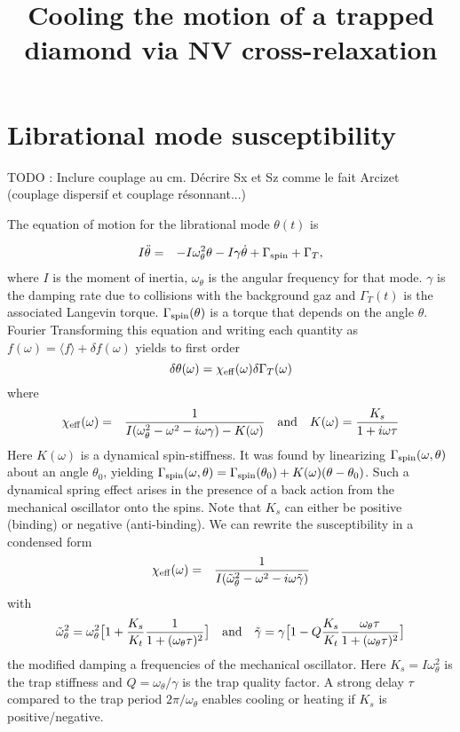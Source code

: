 \documentclass[preprintnumbers,amsmath,amssymb]{revtex4}
\newcommand{\bea}{\begin{eqnarray}}
\newcommand{\eea}{\end{eqnarray}}
\begin{document}
\title{Cooling the motion of a trapped diamond via NV cross-relaxation}

\maketitle

\tableofcontents

\section{Librational mode susceptibility}

TODO : Inclure couplage au cm. Décrire Sx et Sz comme le fait Arcizet (couplage dispersif et couplage résonnant...)

The equation of motion for the librational mode $\theta(t)$ is 

\begin{eqnarray}I \ddot \theta&=& -I \omega_\theta^2 \theta -I\gamma \dot \theta+\Gamma_{\rm spin}+\Gamma_T,
\end{eqnarray}\label{eqnmotion}
where $I$ is the moment of inertia, $\omega_\theta$ is the angular frequency for that mode. $\gamma$ is the damping rate due to collisions with the background gaz and $\Gamma_T(t)$ is the associated Langevin torque.
$\Gamma_{\rm spin}(\theta)$ is a torque that depends on the angle $\theta$. Fourier Transforming this equation and writing each quantity as $f(\omega)=\langle f \rangle+\delta f (\omega)$ yields to first order 
$$\delta \theta(\omega)=\chi_{\rm eff}(\omega)\delta\Gamma_T(\omega)$$
where
\bea
\chi_{\rm eff}(\omega)&=&\frac{1}{I(\omega_\theta^2-\omega^2-i\omega \gamma)-K(\omega)} \quad {\rm and }\quad K(\omega)=\frac{K_s}{1+i\omega\tau}\\
\eea
Here $K(\omega)$ is a dynamical spin-stiffness. 
It was found by linearizing $\Gamma_{\rm spin}(\omega,\theta)$ about an angle $\theta_0$, yielding $\Gamma_{\rm spin}(\omega,\theta)=\Gamma_{\rm spin}(\theta_0)+K(\omega) (\theta-\theta_0)$. Such a dynamical spring effect arises in the presence of a back action from the mechanical oscillator onto the spins. Note that $K_s$ can either be positive (binding) or negative (anti-binding).
We can rewrite the susceptibility in a condensed form 
\bea
\chi_{\rm eff}(\omega)&=&\frac{1}{I(\tilde\omega_\theta^2-\omega^2-i\omega \tilde\gamma)}
\eea
with 
\bea
\tilde\omega_\theta^2=\omega_\theta^2\big[1+\frac{K_s}{K_t}\frac{1}{1+(\omega_\theta\tau)^2}\big] \quad {\rm and} \quad \tilde\gamma=\gamma\big[1-Q\frac{K_s}{K_t}\frac{\omega_\theta\tau}{1+(\omega_\theta\tau)^2}\big]
\eea
the modified damping a frequencies of the mechanical oscillator.
Here $K_s=I\omega_\theta^2$ is the trap stiffness and $Q=\omega_\theta/\gamma$ is the trap quality factor. A strong delay $\tau$ compared to the trap period $2\pi/\omega_\theta$ enables cooling or heating if $K_s$ is positive/negative.
\end{document}
